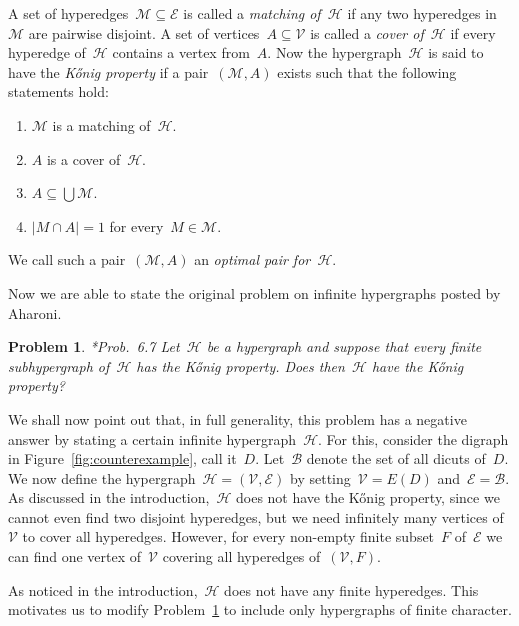\documentclass[reqno, 12pt]{amsart}
\numberwithin{equation}{section}
\numberwithin{figure}{section}
\theoremstyle{plain}
\newtheorem{problem}[thm]{Problem}
\theoremstyle{definition}
\newcommand{\abs}[1]{\ensuremath{{\lvert {#1} \rvert}}}
\begin{document}
A set of hyperedges~${\mathcal{M} \subseteq \mathcal{E}}$ is called a \textit{matching of~$\mathcal{H}$} if any two hyperedges in~$\mathcal{M}$ are pairwise disjoint. 
A set of vertices~${A \subseteq \mathcal{V}}$ is called a \textit{cover of~$\mathcal{H}$} if every hyperedge of~$\mathcal{H}$ contains a vertex from~$A$.
Now the hypergraph~$\mathcal{H}$ is said to have the \textit{K\H{o}nig property} if a pair~${(\mathcal{M}, A)}$ exists such that the following statements hold:
\begin{enumerate}
    \item $\mathcal{M}$ is a matching of~$\mathcal{H}$.
    \item $A$ is a cover of~$\mathcal{H}$.
    \item ${A \subseteq \bigcup \mathcal{M}}$.
    \item ${\abs{M \cap A} = 1}$ for every~${M \in \mathcal{M}}$. 
\end{enumerate}
We call such a pair~${(\mathcal{M}, A)}$ an \textit{optimal pair for~$\mathcal{H}$}.

Now we are able to state the original problem on infinite hypergraphs posted by Aharoni.

\begin{problem}
    \label{prob:aharoni}
    \cite{aharoni-conj}*{Prob.~6.7}
    Let~$\mathcal{H}$ be a hypergraph and suppose that every finite subhypergraph of~$\mathcal{H}$ has the K\H{o}nig property.
    Does then~$\mathcal{H}$ have the K\H{o}nig property?
\end{problem}

We shall now point out that, in full generality, this problem has a negative answer by stating a certain infinite hypergraph~$\mathcal{H}$.
For this, consider the digraph in Figure~\ref{fig:counterexample}, call it~$D$.
Let~$\mathcal{B}$ denote the set of all dicuts of~$D$.
We now define the hypergraph~$\mathcal{H} = (\mathcal{V}, \mathcal{E})$ by setting~${\mathcal{V} = E(D)}$ and~${\mathcal{E} = \mathcal{B}}$.
As discussed in the introduction,~$\mathcal{H}$ does not have the K\H{o}nig property, since we cannot even find two disjoint hyperedges, but we need infinitely many vertices of~$\mathcal{V}$ to cover all hyperedges.
However, for every non-empty finite subset~$F$ of~$\mathcal{E}$ we can find one vertex of~$\mathcal{V}$ covering all hyperedges of~${(\mathcal{V}, F)}$.

As noticed in the introduction,~$\mathcal{H}$ does not have any finite hyperedges.
This motivates us to modify Problem~\ref{prob:aharoni} to include only hypergraphs of finite character.
\end{document}
